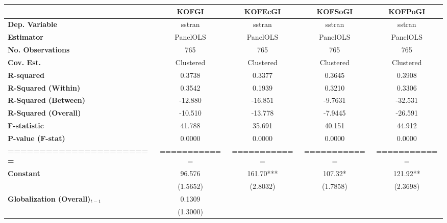 \begin{center}
\begin{tabular}{lcccc}
\toprule
                                   & \textbf{KOFGI} & \textbf{KOFEcGI} & \textbf{KOFSoGI} & \textbf{KOFPoGI}  \\
\midrule
\textbf{Dep. Variable}             &     sstran     &      sstran      &      sstran      &      sstran       \\
\textbf{Estimator}                 &    PanelOLS    &     PanelOLS     &     PanelOLS     &     PanelOLS      \\
\textbf{No. Observations}          &      765       &       765        &       765        &       765         \\
\textbf{Cov. Est.}                 &   Clustered    &    Clustered     &    Clustered     &    Clustered      \\
\textbf{R-squared}                 &     0.3738     &      0.3377      &      0.3645      &      0.3908       \\
\textbf{R-Squared (Within)}        &     0.3542     &      0.1939      &      0.3210      &      0.3306       \\
\textbf{R-Squared (Between)}       &    -12.880     &     -16.851      &     -9.7631      &     -32.531       \\
\textbf{R-Squared (Overall)}       &    -10.510     &     -13.778      &     -7.9445      &     -26.591       \\
\textbf{F-statistic}               &     41.788     &      35.691      &      40.151      &      44.912       \\
\textbf{P-value (F-stat)}          &     0.0000     &      0.0000      &      0.0000      &      0.0000       \\
\textbf{=======================}   &  ============  &   ============   &   ============   &   ============    \\
\textbf{Constant}                     &     96.576     &    161.70***     &     107.32*      &     121.92**      \\
\textbf{ }                         &    (1.5652)    &     (2.8032)     &     (1.7858)     &     (2.3698)      \\
\textbf{Globalization (Overall)$_{t-1}$}               &     0.1309     &                  &                  &                   \\
\textbf{ }                         &    (1.3000)    &                  &                  &                   \\

\end{tabular}
\end{center}
